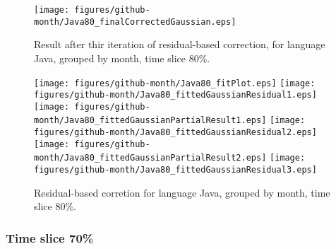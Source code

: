 \begin{figure}[]
\centering
{\texttt{[image: figures/github-month/Java80\_finalCorrectedGaussian.eps]}}
\caption{Result after thir iteration of residual-based correction, for language Java, grouped by month, time slice 80\%.}
\end{figure}


\begin{figure}[hb]
\centering
{}
{\texttt{[image: figures/github-month/Java80\_fitPlot.eps]}}
{\texttt{[image: figures/github-month/Java80\_fittedGaussianResidual1.eps]}}
{\texttt{[image: figures/github-month/Java80\_fittedGaussianPartialResult1.eps]}}
{\texttt{[image: figures/github-month/Java80\_fittedGaussianResidual2.eps]}}
{\texttt{[image: figures/github-month/Java80\_fittedGaussianPartialResult2.eps]}}
{\texttt{[image: figures/github-month/Java80\_fittedGaussianResidual3.eps]}}
\caption{Residual-based corretion for language Java, grouped by month, time slice 80\%.}
\end{figure}


\clearpage 
\newpage 


\FloatBarrier

\subsubsection{Time slice 70\%}

